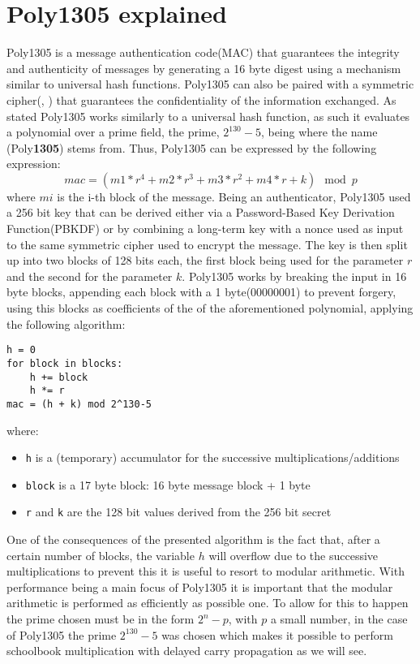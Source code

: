 \documentclass{article}
\begin{document}
\section{Poly1305 explained}
\label{poly135_101}
Poly1305 is a message authentication code(MAC) that guarantees the integrity and authenticity of messages by generating a 16 byte digest using a mechanism similar
to universal hash functions. Poly1305 can also be paired with a symmetric cipher(\cite{poly1305_aes_bernstein}, \cite{poly1305_chacha20_iot}) 
that guarantees the confidentiality of the information exchanged. 
As stated Poly1305 works similarly to a universal hash function, as such it evaluates a polynomial over a prime field, the prime, $2^{130}-5$, being where the 
name (Poly\textbf{1305}) stems from. Thus, Poly1305 can be expressed by the following expression: 
$$mac = (m1 * r^4 + m2 * r^3 + m3 * r^2 + m4 * r + k) \mod{p} $$ 
where $mi$ is the i-th block of the message. Being an authenticator,  Poly1305 used a 256 bit key that can be derived either via a Password-Based Key Derivation 
Function(PBKDF) or by combining a long-term key with a nonce used as input to the same symmetric cipher used to encrypt the message. The key is then split up 
into two blocks of 128 bits each, the first block being used for the parameter $r$ and the second for the parameter $k$. Poly1305 works by breaking the input 
in 16 byte blocks, appending each block with a 1 byte(00000001) to prevent forgery, using this blocks as coefficients of the of the aforementioned polynomial, 
applying the following algorithm:

\begin{Verbatim}[fontsize=\footnotesize]
h = 0
for block in blocks:
    h += block
    h *= r
mac = (h + k) mod 2^130-5
\end{Verbatim}

where:
\begin{itemize}
    \item \texttt{h} is a (temporary) accumulator for the successive multiplications/additions
    \item \texttt{block} is a 17 byte block: 16 byte message block + 1 byte
    \item \texttt{r} and \texttt{k} are the 128 bit values derived from the 256 bit secret
\end{itemize}

One of the consequences of the presented algorithm is the fact that, after a certain number of blocks, the variable $h$ will overflow due to the successive 
multiplications to prevent this it is useful to resort to modular arithmetic. With performance being a main focus of Poly1305 it is important that the modular 
arithmetic is performed as efficiently as possible one. To allow for this to happen the prime chosen must be in the form $2^n-p$, with $p$ a small number, in the 
case of Poly1305 the prime $2^{130}-5$ was chosen which makes it possible to perform schoolbook multiplication with delayed carry propagation as we will see.
\end{document}
